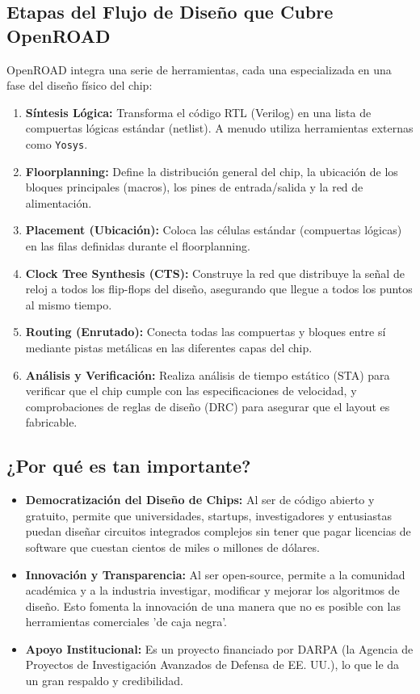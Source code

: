 \documentclass[12pt,a4paper]{article}
\begin{document}
\subsection{Etapas del Flujo de Diseño que Cubre OpenROAD}

OpenROAD integra una serie de herramientas, cada una especializada en una fase del diseño físico del chip:

\begin{enumerate}
    \item \textbf{Síntesis Lógica:} Transforma el código RTL (Verilog) en una lista de compuertas lógicas estándar (netlist). A menudo utiliza herramientas externas como \texttt{Yosys}.
    \item \textbf{Floorplanning:} Define la distribución general del chip, la ubicación de los bloques principales (macros), los pines de entrada/salida y la red de alimentación.
    \item \textbf{Placement (Ubicación):} Coloca las células estándar (compuertas lógicas) en las filas definidas durante el floorplanning.
    \item \textbf{Clock Tree Synthesis (CTS):} Construye la red que distribuye la señal de reloj a todos los flip-flops del diseño, asegurando que llegue a todos los puntos al mismo tiempo.
    \item \textbf{Routing (Enrutado):} Conecta todas las compuertas y bloques entre sí mediante pistas metálicas en las diferentes capas del chip.
    \item \textbf{Análisis y Verificación:} Realiza análisis de tiempo estático (STA) para verificar que el chip cumple con las especificaciones de velocidad, y comprobaciones de reglas de diseño (DRC) para asegurar que el layout es fabricable.
\end{enumerate}

\subsection{¿Por qué es tan importante?}

\begin{itemize}
    \item \textbf{Democratización del Diseño de Chips:} Al ser de código abierto y gratuito, permite que universidades, startups, investigadores y entusiastas puedan diseñar circuitos integrados complejos sin tener que pagar licencias de software que cuestan cientos de miles o millones de dólares.
    \item \textbf{Innovación y Transparencia:} Al ser open-source, permite a la comunidad académica y a la industria investigar, modificar y mejorar los algoritmos de diseño. Esto fomenta la innovación de una manera que no es posible con las herramientas comerciales 'de caja negra'.
    \item \textbf{Apoyo Institucional:} Es un proyecto financiado por DARPA (la Agencia de Proyectos de Investigación Avanzados de Defensa de EE. UU.), lo que le da un gran respaldo y credibilidad.
\end{itemize}
\end{document}
